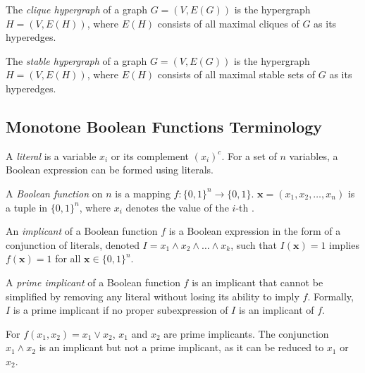 \begin{definition}\label{def:clique}
The \emph{clique hypergraph} of a graph $G=(V,E(G))$ is the hypergraph $H=(V,E(H))$, where $E(H)$ consists of all maximal cliques of $G$ as its hyperedges.
\end{definition}

\begin{definition}
The \emph{stable hypergraph} of a graph $G=(V,E(G))$ is the hypergraph $H=(V,E(H))$, where $E(H)$ consists of all maximal stable sets of $G$ as its hyperedges.
\end{definition}

\subsection{Monotone Boolean Functions Terminology}

\begin{definition}
A \emph{literal} is a variable $x_i$ or its complement $(x_i)^c$. For a set of $n$ variables, a Boolean expression can be formed using literals.
\end{definition}

\begin{definition}
A \emph{Boolean function} on $n$   is a mapping $f:\{0,1\}^n\to\{0,1\}$.   $\mathbf{x}=(x_1,x_2,\dots,x_n)$ is a tuple in $\{0,1\}^n$, where $x_i$ denotes the value of the $i$-th  .
\end{definition}

\begin{definition}
An \emph{implicant} of a Boolean function $f$ is a Boolean expression in the form of a conjunction of literals, denoted $I=x_1\wedge x_2\wedge\dots\wedge x_k$, such that $I(\mathbf{x})=1$ implies $f(\mathbf{x})=1$ for all $\mathbf{x}\in\{0,1\}^n$.
\end{definition}

\begin{definition}
A \emph{prime implicant} of a Boolean function $f$ is an implicant that cannot be simplified by removing any literal without losing its ability to imply $f$. Formally, $I$ is a prime implicant if no proper subexpression of $I$ is an implicant of $f$.
\end{definition}

\begin{example}
For $f(x_1,x_2)=x_1\vee x_2$, $x_1$ and $x_2$ are prime implicants. The conjunction $x_1\wedge x_2$ is an implicant but not a prime implicant, as it can be reduced to $x_1$ or $x_2$.
\end{example}

